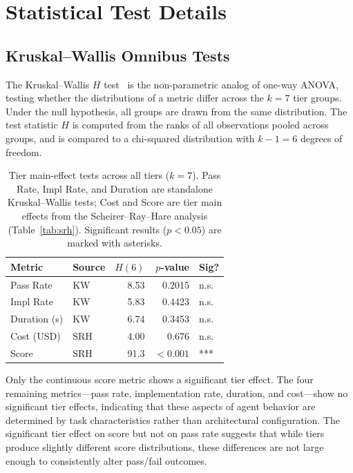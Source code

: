 \documentclass[11pt]{article}
\begin{document}
\section{Statistical Test Details}
\label{app:statistical_details}

\subsection{Kruskal--Wallis Omnibus Tests}

The Kruskal--Wallis $H$ test~\cite{kruskal1952use} is the non-parametric analog of one-way ANOVA,
testing whether the distributions of a metric differ across the $k=7$ tier
groups. Under the null hypothesis, all groups are drawn from the same
distribution. The test statistic $H$ is computed from the ranks of all
observations pooled across groups, and is compared to a chi-squared
distribution with $k-1 = 6$ degrees of freedom.

\begin{table}[htbp]
  \centering
  \caption{Tier main-effect tests across all tiers ($k=7$). Pass Rate,
    Impl Rate, and Duration are standalone Kruskal--Wallis tests; Cost and
    Score are tier main effects from the Scheirer--Ray--Hare analysis
    (Table~\ref{tab:srh}). Significant results ($p < 0.05$) are marked
    with asterisks.}
  \label{tab:kruskal_wallis}
  \small
  \begin{tabular}{llrrl}
    \toprule
    Metric & Source & $H(6)$ & $p$-value & Sig? \\
    \midrule
    Pass Rate       & KW     &   8.53 & 0.2015   & n.s. \\
    Impl Rate       & KW     &   5.83 & 0.4423   & n.s. \\
    Duration (s)    & KW     &   6.74 & 0.3453   & n.s. \\
    Cost (USD)      & SRH    &   4.00 & 0.676    & n.s. \\
    Score           & SRH    &  91.3  & $<0.001$ & *** \\
    \bottomrule
  \end{tabular}
\end{table}

Only the continuous score metric shows a significant tier effect. The four
remaining metrics---pass rate, implementation rate, duration, and cost---show
no significant tier effects, indicating that these aspects of agent behavior
are determined by task characteristics rather than architectural configuration.
The significant tier effect on score but not on pass rate suggests that while
tiers produce slightly different score distributions, these differences are
not large enough to consistently alter pass/fail outcomes.
\end{document}
